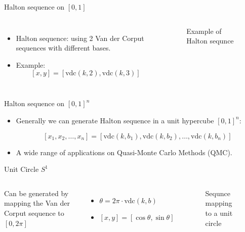 \begin{frame}{Halton sequence on \([0,1]\)}
\protect\hypertarget{halton-sequence-on-01}{}

\begin{columns}


\begin{itemize}
\item
  Halton sequence: using 2 Van der Corput sequences with different
  bases.
\item
  Example: \[[x,y] = [\mathrm{vdc}(k,2), \mathrm{vdc}(k,3)]\]
\end{itemize}


\begin{figure}[hp]
\centering

\caption{Example of Halton sequnce}%
\label{fig:halton}
\end{figure}

\end{columns}

\end{frame}

\begin{frame}{Halton sequence on \([0,1]^n\)}
\protect\hypertarget{halton-sequence-on-01n}{}

\begin{itemize}
\item
  Generally we can generate Halton sequence in a unit hypercube
  \([0,1]^n\):

  \[[x_1, x_2, \ldots, x_n] = [\mathrm{vdc}(k,b_1), \mathrm{vdc}(k,b_2), \ldots, \mathrm{vdc}(k,b_n)]\]
\item
  A wide range of applications on Quasi-Monte Carlo Methods (QMC).
\end{itemize}

\end{frame}

\begin{frame}{Unit Circle \(S^1\)}
\protect\hypertarget{unit-circle-s1}{}

\begin{columns}


Can be generated by mapping the Van der Corput sequence to \([0, 2\pi]\)

\begin{itemize}
\item
  \(\theta = 2\pi \cdot \mathrm{vdc}(k,b)\)
\item
  \([x, y] = [\cos\theta, \sin\theta]\)
\end{itemize}


\begin{figure}[hp]
\centering

\caption{Sequnce mapping to a unit circle}%
\label{fig:circle}
\end{figure}

\end{columns}

\end{frame}

